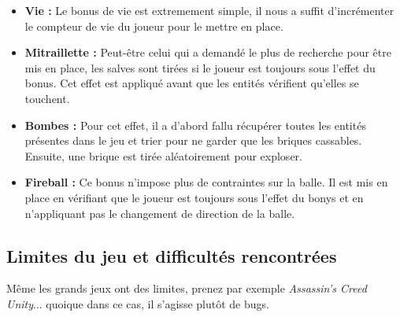 \documentclass[a4paper,10pt]{article}
\begin{document}
        \begin{itemize}
            \item \textbf{Vie :}
                Le bonus de vie est extremement simple, il nous a suffit d'incrémenter le compteur de vie du joueur
                pour le mettre en place.

            \item \textbf{Mitraillette :}
                Peut-être celui qui a demandé le plus de recherche pour être mis en place, les salves sont tirées
                si le joueur est toujours sous l'effet du bonus. Cet effet est appliqué avant que les entités
                vérifient qu'elles se touchent.

            \item \textbf{Bombes :}
                Pour cet effet, il a d'abord fallu récupérer toutes les entités présentes dans le jeu et trier
                pour ne garder que les briques cassables. Ensuite, une brique est tirée aléatoirement pour exploser.

            \item \textbf{Fireball :}
                Ce bonus n'impose plus de contraintes sur la balle. Il est mis en place en vérifiant que le joueur
                est toujours sous l'effet du bonys et en n'appliquant pas le changement de direction de la balle.
        \end{itemize}



\subsection{Limites du jeu et difficultés rencontrées}


Même les grands jeux ont des limites, prenez par exemple \textit{Assassin's Creed Unity}... quoique dans ce cas,
il s'agisse plutôt de bugs. \\
\end{document}
